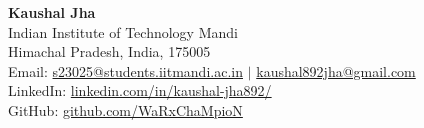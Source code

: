 \documentclass[letterpaper,10pt]{article}
\newcommand{\sectionline}[1]{%
    \vspace{0.7em}%
    \textbf{\large #1} \vspace{-2.0em}\\%
    
    \rule{\textwidth}{0.5pt}%
    \vspace{0.25em}%
}
\begin{document}

    {\huge \textbf{Kaushal Jha}}\\
        \vspace{2pt}
    Indian Institute of Technology Mandi \\
    \vspace{2pt}
    Himachal Pradesh, India, 175005\\
    \vspace{2pt}
    Email: \href{mailto:s23025@students.iitmandi.ac.in}{s23025@students.iitmandi.ac.in} $\mid$ \href{kaushal892jha@gmail.com}{kaushal892jha@gmail.com}\\
    \vspace{2pt}
    LinkedIn: \href{https://www.linkedin.com/in/kaushal-jha892/}{ linkedin.com/in/kaushal-jha892/}\\
    \vspace{2pt}
    GitHub: \href{ https://github.com/WaRxChaMpioN/SciML_ass_Kaushal.git}{github.com/WaRxChaMpioN}

\vspace{2pt}
\end{document}
